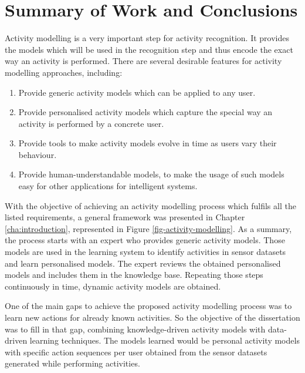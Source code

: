 \section{Summary of Work and Conclusions}
\label{sec:conclusions:conclusions}

Activity modelling is a very important step for activity recognition. It provides the models which will be used in the recognition step and thus encode the exact way an activity is performed. There are several desirable features for activity modelling approaches, including:

\begin{enumerate}
 \item Provide generic activity models which can be applied to any user.
 \item Provide personalised activity models which capture the special way an activity is performed by a concrete user.
 \item Provide tools to make activity models evolve in time as users vary their behaviour.
 \item Provide human-understandable models, to make the usage of such models easy for other applications for intelligent systems.
\end{enumerate}

With the objective of achieving an activity modelling process which fulfils all the listed requirements, a general framework was presented in Chapter \ref{cha:introduction}, represented in Figure \ref{fig-activity-modelling}. As a summary, the process starts with an expert who provides generic activity models. Those models are used in the learning system to identify activities in sensor datasets and learn personalised models. The expert reviews the obtained personalised models and includes them in the knowledge base. Repeating those steps continuously in time, dynamic activity models are obtained.

One of the main gaps to achieve the proposed activity modelling process was to learn new actions for already known activities. So the objective of the dissertation was to fill in that gap, combining knowledge-driven activity models with data-driven learning techniques. The models learned would be personal activity models with specific action sequences per user obtained from the sensor datasets generated while performing activities.

